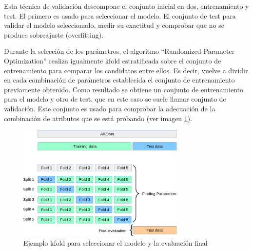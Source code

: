 Esta técnica de validación descompone el conjunto inicial en dos, entrenamiento y test. El primero es usado para seleccionar el modelo. El conjunto de test para validar el modelo seleccionado, medir su exactitud y comprobar que no se produce sobreajuste (overfitting).

Durante la selección de los parámetros, el algoritmo ``Randomized Parameter Optimization'' realiza igualmente \gls{kfold}  estratificada sobre el conjunto de entrenamiento para comparar los candidatos entre ellos. Es decir, vuelve a dividir en cada combinación de parámetros establecida el conjunto de entrenamiento previamente obtenido. Como resultado se obtiene un conjunto de entrenamiento para el modelo y otro de test, que en este caso se suele llamar conjunto de validación. Este conjunto es usado para comprobar la adecuación de la combinación de atributos que se está probando (ver imagen \ref{figure:kfold}).

\begin{figure}[H]
\centering
\includegraphics[width=0.74\textwidth]{figs/experimentos/kfold.png}
\caption{Ejemplo \gls{kfold} para seleccionar el modelo y la evaluación final \cite{GitHubCompleto}}
\label{figure:kfold}
\end{figure}
